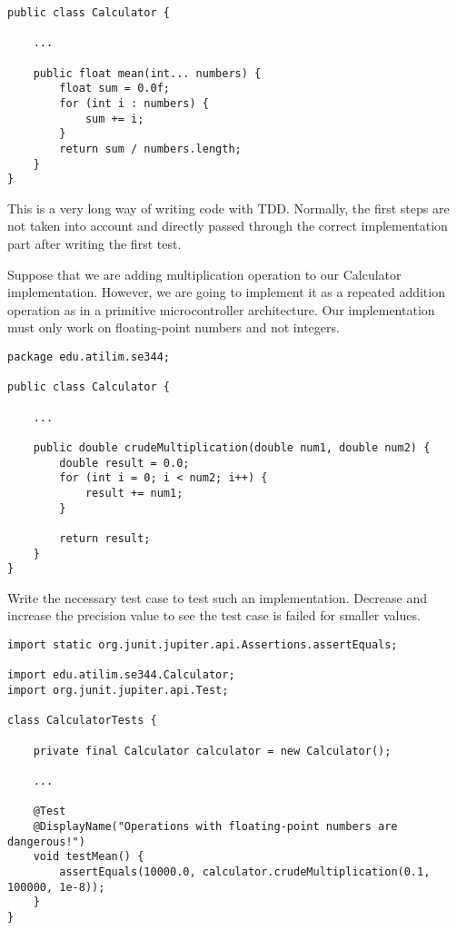 \begin{exercise}
\begin{lstlisting}[caption={A correct implementation of the mean operation.}]
public class Calculator {
    
    ...
    
    public float mean(int... numbers) {
        float sum = 0.0f;
        for (int i : numbers) {
            sum += i;
        }
        return sum / numbers.length;
    }
}
    \end{lstlisting}
    This is a very long way of writing code with TDD. Normally, the first steps are not taken into account and directly passed through the correct implementation part after writing the first test.
\end{exercise}

\begin{exercise}
    Suppose that we are adding multiplication operation to our Calculator implementation. However, we are going to implement it as a repeated addition operation as in a primitive microcontroller architecture. Our implementation must only work on floating-point numbers and not integers.
    
    \begin{lstlisting}[caption={An implementation for multiplication operation with a loop.}]
package edu.atilim.se344;

public class Calculator {
    
    ...
    
    public double crudeMultiplication(double num1, double num2) {
        double result = 0.0;
        for (int i = 0; i < num2; i++) {
            result += num1;
        }
        
        return result;
    }
}
    \end{lstlisting}
    
    Write the necessary test case to test such an implementation. Decrease and increase the precision value to see the test case is failed for smaller values.

    \begin{lstlisting}[caption={A floating-point assert statement with precision.}]
import static org.junit.jupiter.api.Assertions.assertEquals;

import edu.atilim.se344.Calculator;
import org.junit.jupiter.api.Test;

class CalculatorTests {

    private final Calculator calculator = new Calculator();

    ...
    
    @Test
    @DisplayName("Operations with floating-point numbers are dangerous!")
    void testMean() {
        assertEquals(10000.0, calculator.crudeMultiplication(0.1, 100000, 1e-8));
    }
}
    \end{lstlisting}
\end{exercise}
